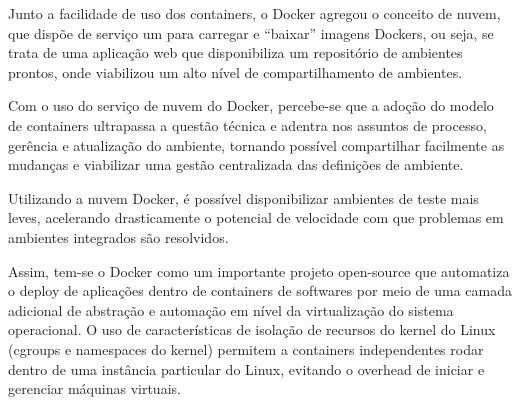 Junto a facilidade de uso dos containers, o Docker agregou o 
conceito de nuvem, que dispõe de serviço um para carregar e 
“baixar” imagens Dockers, ou seja, se trata de uma aplicação 
web que disponibiliza um repositório de ambientes prontos, 
onde viabilizou um alto nível de compartilhamento de ambientes.

Com o uso do serviço de nuvem do Docker, percebe-se que a 
adoção do modelo de containers ultrapassa a questão técnica 
e adentra nos assuntos de processo, gerência e atualização 
do ambiente, tornando possível compartilhar facilmente as 
mudanças e viabilizar uma gestão centralizada das definições 
de ambiente.

Utilizando a nuvem Docker, é possível disponibilizar ambientes de 
teste mais leves, acelerando drasticamente o potencial de velocidade 
com que problemas em ambientes integrados são resolvidos.

Assim, tem-se o Docker como um importante projeto open-source 
que automatiza o deploy de aplicações dentro de containers de 
softwares por meio de uma camada adicional de abstração e automação 
em nível da virtualização do sistema operacional. O uso de 
características de isolação de recursos do kernel do Linux 
(cgroups e namespaces do kernel) permitem a containers 
independentes rodar dentro de uma instância particular do Linux, 
evitando o overhead de iniciar e gerenciar máquinas virtuais.
